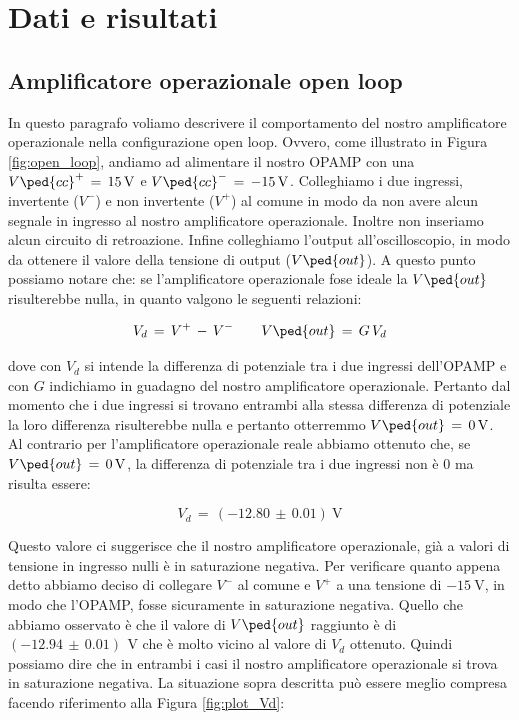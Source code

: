 \section*{Dati e risultati}

\subsection*{Amplificatore operazionale open loop}

In questo paragrafo voliamo descrivere il comportamento del nostro amplificatore operazionale nella configurazione open loop. Ovvero, come illustrato in Figura \ref{fig:open_loop}, andiamo ad alimentare il nostro OPAMP con una $V\ped{cc}^+\,=\,\SI{+15}{\volt}$ e $V\ped{cc}^-\,=\,\SI{-15}{\volt}$. Colleghiamo i due ingressi, invertente ($V^-$) e non invertente ($V^+$) al comune in modo da non avere alcun segnale in ingresso al nostro amplificatore operazionale. Inoltre non inseriamo alcun circuito di retroazione. Infine colleghiamo l'output all'oscilloscopio, in modo da ottenere il valore della tensione di output ($V\ped{out}$).
A questo punto possiamo notare che: se l'amplificatore operazionale fose ideale la $V\ped{out}$ risulterebbe nulla, in quanto valgono le seguenti relazioni:

\begin{equation}
	V_d\,=\,V^+\,-\,V^- \qquad V\ped{out}\,=\,G\,V_d
\end{equation}

dove con $V_d$ si intende la differenza di potenziale tra i due ingressi dell'OPAMP e con $G$ indichiamo in guadagno del nostro amplificatore operazionale. Pertanto dal momento che i due ingressi si trovano entrambi alla stessa differenza di potenziale la loro differenza risulterebbe nulla e pertanto otterremmo $V\ped{out}\,=\,\SI{0}{\volt}$.
Al contrario per l'amplificatore operazionale reale abbiamo ottenuto che, se $V\ped{out}\,=\,\SI{0}{\volt}$, la differenza di potenziale tra i due ingressi non è 0 ma risulta essere:

\begin{equation}
	V_d\,=\,(-12.80\,\pm\,0.01) \SI{}{\volt}
\end{equation}

Questo valore ci suggerisce che il nostro amplificatore operazionale, già a valori di tensione in ingresso nulli è in saturazione negativa. Per verificare quanto appena detto abbiamo deciso di collegare $V^-$ al comune e $V^+$ a una tensione di $\SI{-15}{\volt}$, in modo che l'OPAMP, fosse sicuramente in saturazione negativa. Quello che abbiamo osservato è che il valore di $V\ped{out}$ raggiunto è di $(-12.94\,\pm\,0.01)\,\SI{}{\volt}$ che è molto vicino al valore di $V_d$ ottenuto. Quindi possiamo dire che in entrambi i casi il nostro amplificatore operazionale si trova in saturazione negativa.
La situazione sopra descritta può essere meglio compresa facendo riferimento alla Figura \ref{fig:plot_Vd}:

